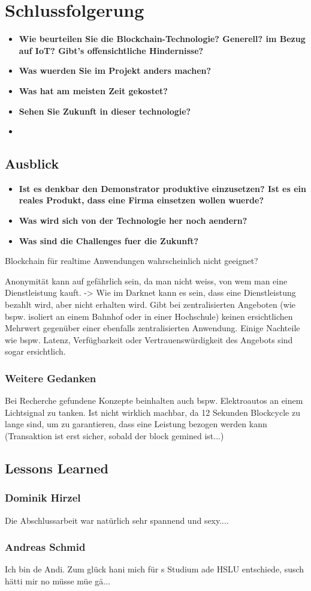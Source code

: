 \chapter{Schlussfolgerung}
\label{cha:Schlussfolgerung}
\begin{itemize}
    \item \textbf{Wie beurteilen Sie die Blockchain-Technologie? Generell? im Bezug auf IoT? Gibt's offensichtliche Hindernisse?}
    \item \textbf{Was wuerden Sie im Projekt anders machen?}
    \item \textbf{Was hat am meisten Zeit gekostet?}
    
    \item \textbf{Sehen Sie Zukunft in dieser technologie?}
    \item \textbf{}
\end{itemize}

\section{Ausblick}
\label{sec:Ausblick}
\begin{itemize}
    \item \textbf{Ist es denkbar den Demonstrator produktive einzusetzen? Ist es ein reales Produkt, dass eine Firma einsetzen wollen wuerde?}
    \item \textbf{Was wird sich von der Technologie her noch aendern?}
    \item \textbf{Was sind die Challenges fuer die Zukunft?}
\end{itemize}
Blockchain für realtime Anwendungen wahrscheinlich nicht geeignet?
\par
Anonymität kann auf gefährlich sein, da man nicht weiss, von wem man eine Dienstleistung kauft. -> Wie im Darknet kann es sein, dass eine Dienstleistung bezahlt wird, aber nicht erhalten wird.
Gibt bei zentralisierten Angeboten (wie bspw. isoliert an einem Bahnhof oder in einer Hochschule) keinen ersichtlichen Mehrwert gegenüber einer ebenfalls zentralisierten Anwendung. Einige Nachteile wie bspw. Latenz, Verfügbarkeit oder Vertrauenswürdigkeit des Angebots sind sogar ersichtlich.

\subsection{Weitere Gedanken}
Bei Recherche gefundene Konzepte beinhalten auch bspw. Elektroautos an einem Lichtsignal zu tanken. Ist nicht wirklich machbar, da 12 Sekunden Blockcycle zu lange sind, um zu garantieren, dass eine Leistung bezogen werden kann (Transaktion ist erst sicher, sobald der block gemined ist...)



\section{Lessons Learned}
\label{sec:Lessons_Learned}

\subsection{Dominik Hirzel}
Die Abschlussarbeit war natürlich sehr spannend und sexy....

\subsection{Andreas Schmid}
Ich bin de Andi. Zum glück hani mich für s Studium ade HSLU entschiede, susch hätti mir no müsse müe gä...
